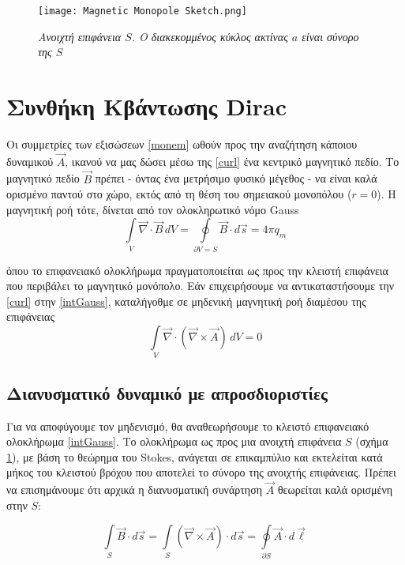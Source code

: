 \begin{figure}[t]
    \centering
    \texttt{[image: Magnetic Monopole Sketch.png]}
    \caption{\textit{Ανοιχτή επιφάνεια $S$. Ο διακεκομμένος κύκλος ακτίνας $a$ είναι σύνορο της $S$}}
    \label{fig:opensurf}
\end{figure}
\section{Συνθήκη Κβάντωσης Dirac}
\noindent Οι συμμετρίες των εξισώσεων \eqref{monem} ωθούν προς την αναζήτηση κάποιου δυναμικού $\Vec{A}$, ικανού να μας δώσει  μέσω της \eqref{curl} ένα κεντρικό μαγνητικό πεδίο. Το μαγνητικό πεδίο $\vec{B}$ πρέπει - όντας ένα μετρήσιμο φυσικό μέγεθος - να είναι καλά ορισμένο παντού στο χώρο, εκτός από τη θέση του σημειακού μονοπόλου ($r = 0$). Η μαγνητική ροή τότε, δίνεται από τον ολοκληρωτικό νόμο Gauss 
\begin{equation}\label{intGauss}
    \int\limits_V \vec{\nabla} \cdot \Vec{B}\, dV = \oint\limits_{\partial V = S} \Vec{B} \cdot d\Vec{s} = 4\pi q_m
\end{equation}

\noindent όπου το επιφανειακό ολοκλήρωμα πραγματοποιείται ως προς την κλειστή επιφάνεια που περιβάλει το μαγνητικό μονόπολο. %
Εάν επιχειρήσουμε να αντικαταστήσουμε την \eqref{curl} στην \eqref{intGauss}, καταλήγοθμε σε μηδενική μαγνητική ροή διαμέσου της επιφάνειας
\begin{equation*}
    \int\limits_V \vec{\nabla} \cdot \left( \vec{\nabla} \times \vec{A} \right) \, dV = 0
\end{equation*}

\subsection{Διανυσματικό δυναμικό με απροσδιοριστίες}
 Για να αποφύγουμε τον μηδενισμό, θα αναθεωρήσουμε το κλειστό επιφανειακό ολοκλήρωμα \eqref{intGauss}. Το ολοκλήρωμα ως προς μια ανοιχτή επιφάνεια $S$ (σχήμα \ref{fig:opensurf}), με βάση το θεώρημα του Stokes, ανάγεται σε επικαμπύλιο και εκτελείται κατά μήκος του κλειστού βρόχου που αποτελεί το σύνορο της ανοιχτής επιφάνειας. Πρέπει να επισημάνουμε ότι αρχικά η διανυσματική συνάρτηση $\vec{A}$ θεωρείται καλά ορισμένη στην $S$:

\begin{equation}\label{lineint}
    \int\limits_{S}  \vec{B} \cdot d\vec{s} = \int\limits_{S}(\vec{\nabla}\times \vec{A} )\cdot d\vec{s} = \oint\limits_{\partial S} \vec{A} \cdot d\vec{\ell}
\end{equation}

